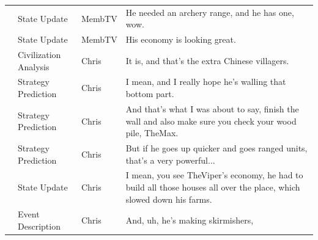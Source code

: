 {\begin{longtable}{@{}>{\theAppRow}r|L{2.3cm}L{1.0cm}U{11.55cm}@{}}
    & State Update          & MembTV       & He needed an archery range, and he has one, wow.                                                                                                                                                                                                                 \\
    & State Update          & MembTV       & His economy is looking great.                                                                                                                                                                                                                                    \\
    & Civilization Analysis & Chris        & It is, and that's the extra Chinese villagers.                                                                                                                                                                                                                   \\
    & Strategy Prediction   & Chris        & I mean, and I really hope he's walling that bottom part.                                                                                                                                                                                                         \\
    & Strategy Prediction   & Chris        & And that's what I was about to say, finish the wall and also make sure you check your wood pile, TheMax.                                                                                                                                                         \\
    & Strategy Prediction   & Chris        & But if he goes up quicker and goes ranged units, that's a very powerful...                                                                                                                                                                                       \\
    & State Update          & Chris        & I mean, you see TheViper's economy, he had to build all those houses all over the place, which slowed down his farms.                                                                                                                                            \\
    & Event Description     & Chris        & And, uh, he's making skirmishers,                                                                                                                                                                                                                                \\

\end{longtable}}
